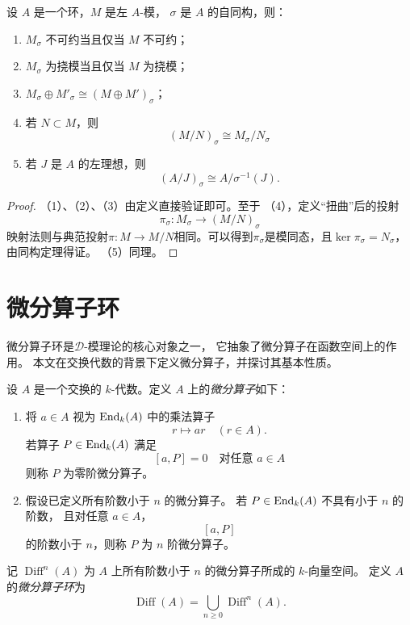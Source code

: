 \documentclass[12pt,a4paper]{ctexrep}   %
\begin{document}
\begin{proposition}
    \label{pro:twisting}
    设 $A$ 是一个环，$M$ 是左 $A$-模，
    $\sigma$ 是 $A$ 的自同构，则：
    \begin{enumerate}[label=(\arabic*)]
        \item $M_\sigma$ 不可约当且仅当 $M$ 不可约；
        \item $M_\sigma$ 为挠模当且仅当 $M$ 为挠模；
        \item $M_\sigma \oplus M'_\sigma \cong (M\oplus M')_\sigma$；
        \item 若 $N\subset M$，则
              \[
                  (M/N)_\sigma \cong M_\sigma/N_\sigma
              \]
        \item 若 $J$ 是 $A$ 的左理想，则
              \[
                  (A/J)_\sigma \cong A/\sigma^{-1}(J).
              \]
    \end{enumerate}
    \begin{proof}
        （1）、（2）、（3）由定义直接验证即可。至于
        （4），定义“扭曲”后的投射
        \begin{equation*}
            \pi_\sigma : M_\sigma \to \left(M/N\right)_\sigma
        \end{equation*}
        映射法则与典范投射$\pi:M\to M/N$相同。可以得到$\pi _\sigma$是模同态，且$\ker \pi_\sigma=N_\sigma$，由同构定理得证。
        （5）同理。
    \end{proof}
\end{proposition}

\section{微分算子环}
微分算子环是$\mathcal{D}$-模理论的核心对象之一，
它抽象了微分算子在函数空间上的作用。
本文在交换代数的背景下定义微分算子，并探讨其基本性质。
\begin{definition}
    设 $A$ 是一个交换的 $k$-代数。定义 $A$ 上的\emph{微分算子}如下：
    \begin{enumerate}[label=(\roman*)]
        \item
              将 $a \in A$ 视为 $\operatorname{End}_k(A)$ 中的乘法算子
              \[
                  r \longmapsto ar \quad (r \in A).
              \]
              若算子 $P \in \operatorname{End}_k(A)$ 满足
              \[
                  [a,P]=0 \quad \text{对任意 } a\in A
              \]
              则称 $P$ 为零阶微分算子。

        \item
              假设已定义所有阶数小于 $n$ 的微分算子。
              若 $P \in \operatorname{End}_k(A)$ 不具有小于 $n$ 的阶数，
              且对任意 $a \in A$，
              \[
                  [a,P]
              \]
              的阶数小于 $n$，则称 $P$ 为 $n$ 阶微分算子。
    \end{enumerate}
    记 $\operatorname{Diff}^n(A)$ 为 $A$ 上所有阶数小于 $n$
    的微分算子所成的 $k$-向量空间。
    定义 $A$ 的\emph{微分算子环}为
    \[
        \operatorname{Diff}(A)
        =
        \bigcup_{n \geq 0} \operatorname{Diff}^n(A).
    \]
\end{definition}
\end{document}
